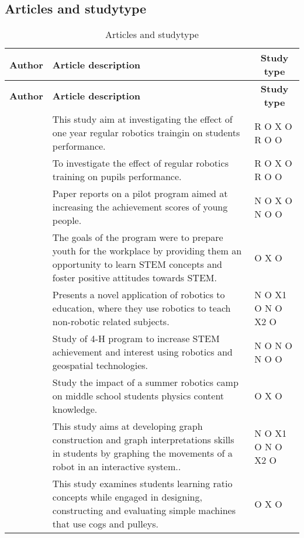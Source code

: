\subsection*{Articles and studytype}
\setlength\LTleft{0px}
\setlength\LTright{0px}
\begin{longtable}{@{\extracolsep{\fill}}p{}p{}p{}}
	
	
	\hline \multicolumn{1}{l}{\textbf{Author}} & \multicolumn{1}{l}{\textbf{Article description}} & \multicolumn{1}{c}{\textbf{Study type	}} \\ \hline\hline
	\endfirsthead
	\hline\multicolumn{1}{l}{\textbf{Author}} & \multicolumn{1}{l}{\textbf{Article description}} & \multicolumn{1}{c}{\textbf{Study type	}} \\ \hline\hline
	\endhead
	\hline \caption{Articles and studytype}\endlastfoot
	\tcite{hussain2006effect} & This study aim at investigating the effect of one year regular robotics traingin on students performance. & R O X O R O O\\\hline
	\tcite{lindh2007does} & To investigate the effect of regular robotics training on pupils performance. & R O X O R O O\\\hline
	\tcite{barker2007robotics}& Paper reports on a pilot program aimed at increasing the achievement scores of young people. & N O X O N O O\\\hline
	\tcite{nugent2009use} & The goals of the program were to prepare youth for the workplace by providing them an opportunity to learn STEM concepts and foster positive attitudes towards STEM. & O X O\\\hline
	\tcite{mitnik2008autonomous} & Presents a novel application of robotics to education, where they use robotics to teach non-robotic related subjects. & N O X1 O N O X2 O\\\hline
	\tcite{nugent2008effect} & Study of 4-H program to increase STEM achievement and interest using robotics and geospatial technologies. & N O N O N O O\\\hline
	\tcite{williams2007acquisition} & Study the impact of a summer robotics camp on middle school students physics content knowledge.  & O X O\\\hline
	\tcite{mitnik2009collaborative} & This study aims at developing graph construction and graph interpretations skills in students by graphing the movements of a robot in an interactive system..  & N O X1 O N O X2 O\\\hline
	\tcite{norton2004using} & This study examines students learning ratio concepts while engaged in designing, constructing and evaluating simple machines that use cogs and pulleys.  & O X O\\\hline
\end{longtable}
